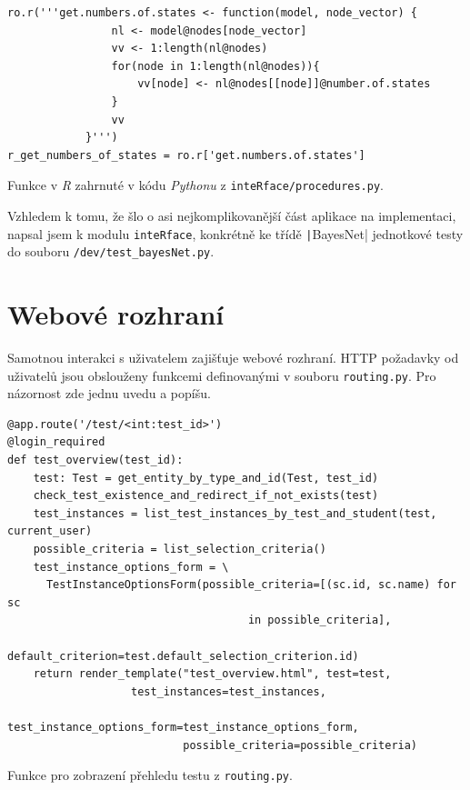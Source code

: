 \documentclass[a4paper,twoside,12pt]{scrbook}
\begin{document}
\begin{listing}
\centering
\begin{verbatim}
ro.r('''get.numbers.of.states <- function(model, node_vector) {
                nl <- model@nodes[node_vector]
                vv <- 1:length(nl@nodes)
                for(node in 1:length(nl@nodes)){
                    vv[node] <- nl@nodes[[node]]@number.of.states
                }
                vv
            }''')
r_get_numbers_of_states = ro.r['get.numbers.of.states']
\end{verbatim}
\caption{Funkce v \textit{R} zahrnuté v kódu \textit{Pythonu} z \texttt{inteRface/procedures.py}.}
\label{lst:PyR}
\end{listing}

Vzhledem k tomu, že šlo o asi nejkomplikovanější část aplikace na implementaci, napsal jsem k modulu \texttt{inteRface}, konkrétně ke třídě \texttt|BayesNet| jednotkové testy do souboru \texttt{/dev/test\_bayesNet.py}.

\section{Webové rozhraní}
Samotnou interakci s uživatelem zajišťuje webové rozhraní. HTTP požadavky od uživatelů jsou obslouženy funkcemi definovanými v souboru \texttt{routing.py}. Pro názornost zde jednu uvedu a popíšu.

\begin{listing}
\centering
\begin{verbatim}
@app.route('/test/<int:test_id>')
@login_required
def test_overview(test_id):
    test: Test = get_entity_by_type_and_id(Test, test_id)
    check_test_existence_and_redirect_if_not_exists(test)
    test_instances = list_test_instances_by_test_and_student(test, current_user)
    possible_criteria = list_selection_criteria()
    test_instance_options_form = \
      TestInstanceOptionsForm(possible_criteria=[(sc.id, sc.name) for sc
			                         in possible_criteria],
                              default_criterion=test.default_selection_criterion.id)
    return render_template("test_overview.html", test=test,
		           test_instances=test_instances,
                           test_instance_options_form=test_instance_options_form,
                           possible_criteria=possible_criteria)

\end{verbatim}
\caption{Funkce pro zobrazení přehledu testu z \texttt{routing.py}.}
\label{lst:test_view}
\end{listing}
\end{document}
